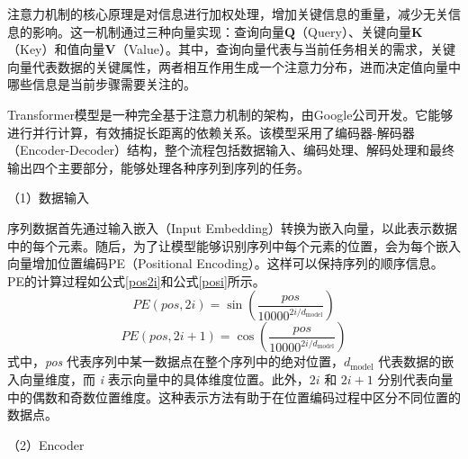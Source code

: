 注意力机制的核心原理是对信息进行加权处理，增加关键信息的重量，减少无关信息的影响。这一机制通过三种向量实现：查询向量$\mathbf{Q}$（Query）、关键向量$\mathbf{K}$（Key）和值向量$\mathbf{V}$（Value）。其中，查询向量代表与当前任务相关的需求，关键向量代表数据的关键属性，两者相互作用生成一个注意力分布，进而决定值向量中哪些信息是当前步骤需要关注的。

Transformer模型是一种完全基于注意力机制的架构，由Google公司开发\cite{vaswani2023attention}。它能够进行并行计算，有效捕捉长距离的依赖关系。该模型采用了编码器-解码器（Encoder-Decoder）结构，整个流程包括数据输入、编码处理、解码处理和最终输出四个主要部分，能够处理各种序列到序列的任务。

（1）数据输入

序列数据首先通过输入嵌入（Input Embedding）转换为嵌入向量，以此表示数据中的每个元素。随后，为了让模型能够识别序列中每个元素的位置，会为每个嵌入向量增加位置编码PE（Positional Encoding）。这样可以保持序列的顺序信息。
PE的计算过程如公式\eqref{pos2i}和公式\eqref{posi}所示。
\begin{equation}
    PE(pos, 2i) = \sin\left(\frac{pos}{10000^{2i/d_{\text{model}}}}\right)
    \label{pos2i}
\end{equation}
\begin{equation}
    PE(pos, 2i+1) = \cos\left(\frac{pos}{10000^{2i/d_{\text{model}}}}\right)
    \label{posi}
\end{equation}
式中，\textit{pos} 代表序列中某一数据点在整个序列中的绝对位置，\(d_{\text{model}}\) 代表数据的嵌入向量维度，而 \textit{i} 表示向量中的具体维度位置。此外，\(2i\) 和 \(2i + 1\) 分别代表向量中的偶数和奇数位置维度。这种表示方法有助于在位置编码过程中区分不同位置的数据点。

（2）Encoder


